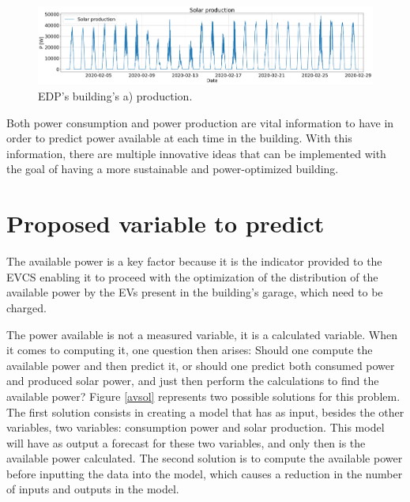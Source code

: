 \begin{figure}[h!]
    \centering
    \begin{center}
    \includegraphics[width=1\textwidth]{Images/power_production.png}
    \caption{EDP's building's a) production.}
    \label{production}
    \end{center}
\end{figure}


Both power consumption and power production are vital information to have in order to predict power available at each time in the building. With this information, there are multiple innovative ideas that can be implemented with the goal of having a more sustainable and power-optimized building.

\section{Proposed variable to predict}\label{chap3:sec:variable_to_predict}

The available power is a key factor because it is the indicator provided to the \ac{EVCS} enabling it to proceed with the optimization of the distribution of the available power by the \ac{EV}s present in the building's garage, which need to be charged.

The power available is not a measured variable, it is a calculated variable. When it comes to computing it, one question then arises: Should one compute the available power and then predict it, or should one predict both consumed power and produced solar power, and just then perform the calculations to find the available power? Figure \ref{avsol} represents two possible solutions for this problem. The first solution consists in creating a model that has as input, besides the other variables, two variables: consumption power and solar production. This model will have as output a forecast for these two variables, and only then is the available power calculated. The second solution is to compute the available power before inputting the data into the model, which causes a reduction in the number of inputs and outputs in the model. 

